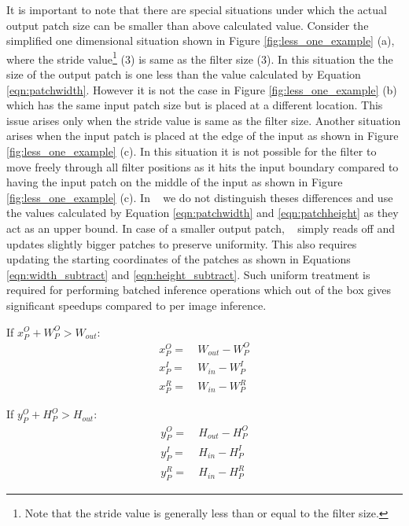 It is important to note that there are special situations under which the actual output patch size can be smaller than above calculated value. Consider the simplified one dimensional situation shown in Figure \ref{fig:less_one_example} (a), where the stride value\footnote{Note that the stride value is generally less than or equal to the filter size.} (3) is same as the filter size (3). In this situation the the size of the output patch is one less than the value calculated by Equation \ref{eqn:patchwidth}. However it is not the case in Figure \ref{fig:less_one_example} (b) which has the same input patch size but is placed at a different location. This issue arises only when the stride value is same as the filter size.
Another situation arises when the input patch is placed at the edge of the input as shown in Figure \ref{fig:less_one_example} (c). In this situation it is not possible for the filter to move freely through all filter positions as it hits the input boundary compared to having the input patch on the middle of the input as shown in Figure \ref{fig:less_one_example} (c).
In \system~ we do not distinguish theses differences and use the values calculated by Equation \ref{eqn:patchwidth} and \ref{eqn:patchheight} as they act as an upper bound. In case of a smaller output patch, \system~ simply reads off and updates slightly bigger patches to preserve uniformity.
This also requires updating the starting coordinates of the patches as shown in Equations \ref{eqn:width_subtract} and \ref{eqn:height_subtract}.
Such uniform treatment is required for performing batched inference operations which out of the box gives significant speedups compared to per image inference.

\vspace{2mm}
\hspace{4mm} If $x^O_P + W^O_P > W_{out}:$
\begin{align}
\label{eqn:width_subtract}
x^O_P = &~ W_{out} - W^O_P\\
x^I_P = &~ W_{in} - W^I_P\\
x^R_P = &~ W_{in} - W^R_P
\end{align}

\hspace{4mm} If $y^O_P + H^O_P > H_{out}:$
\begin{align}
\label{eqn:height_subtract}
y^O_P = &~ H_{out} - H^O_P\\
y^I_P = &~ H_{in} - H^I_P\\
y^R_P = &~ H_{in} - H^R_P
\end{align}


